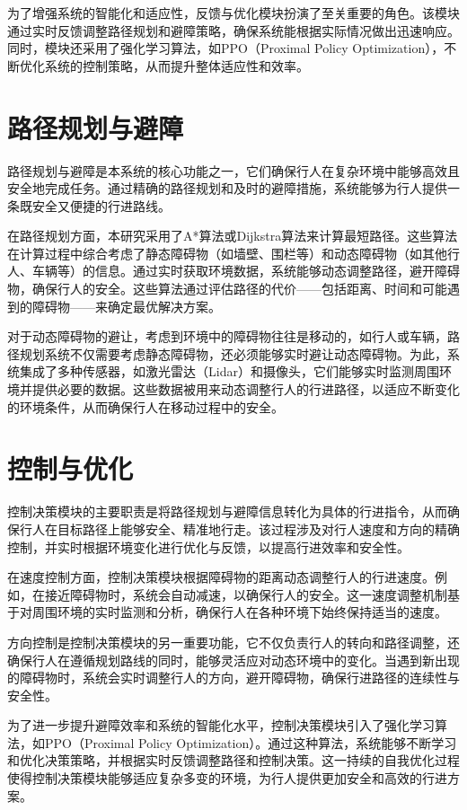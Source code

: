 为了增强系统的智能化和适应性，反馈与优化模块扮演了至关重要的角色。该模块通过实时反馈调整路径规划和避障策略，确保系统能根据实际情况做出迅速响应。同时，模块还采用了强化学习算法，如PPO（Proximal Policy Optimization），不断优化系统的控制策略，从而提升整体适应性和效率。

\section{路径规划与避障}
路径规划与避障是本系统的核心功能之一，它们确保行人在复杂环境中能够高效且安全地完成任务。通过精确的路径规划和及时的避障措施，系统能够为行人提供一条既安全又便捷的行进路线。

在路径规划方面，本研究采用了A*算法或Dijkstra算法来计算最短路径。这些算法在计算过程中综合考虑了静态障碍物（如墙壁、围栏等）和动态障碍物（如其他行人、车辆等）的信息。通过实时获取环境数据，系统能够动态调整路径，避开障碍物，确保行人的安全。这些算法通过评估路径的代价——包括距离、时间和可能遇到的障碍物——来确定最优解决方案。

对于动态障碍物的避让，考虑到环境中的障碍物往往是移动的，如行人或车辆，路径规划系统不仅需要考虑静态障碍物，还必须能够实时避让动态障碍物。为此，系统集成了多种传感器，如激光雷达（Lidar）和摄像头，它们能够实时监测周围环境并提供必要的数据。这些数据被用来动态调整行人的行进路径，以适应不断变化的环境条件，从而确保行人在移动过程中的安全。

\section{控制与优化}
控制决策模块的主要职责是将路径规划与避障信息转化为具体的行进指令，从而确保行人在目标路径上能够安全、精准地行走。该过程涉及对行人速度和方向的精确控制，并实时根据环境变化进行优化与反馈，以提高行进效率和安全性。

在速度控制方面，控制决策模块根据障碍物的距离动态调整行人的行进速度。例如，在接近障碍物时，系统会自动减速，以确保行人的安全。这一速度调整机制基于对周围环境的实时监测和分析，确保行人在各种环境下始终保持适当的速度。

方向控制是控制决策模块的另一重要功能，它不仅负责行人的转向和路径调整，还确保行人在遵循规划路线的同时，能够灵活应对动态环境中的变化。当遇到新出现的障碍物时，系统会实时调整行人的方向，避开障碍物，确保行进路径的连续性与安全性。

为了进一步提升避障效率和系统的智能化水平，控制决策模块引入了强化学习算法，如PPO（Proximal Policy Optimization）。通过这种算法，系统能够不断学习和优化决策策略，并根据实时反馈调整路径和控制决策。这一持续的自我优化过程使得控制决策模块能够适应复杂多变的环境，为行人提供更加安全和高效的行进方案。

